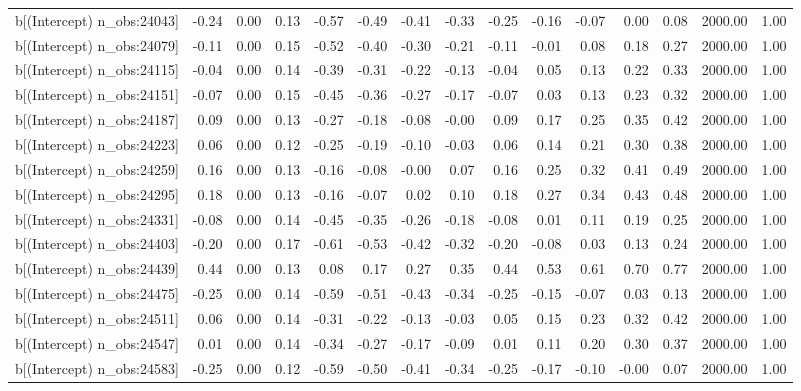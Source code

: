 \begin{table}[ht]
\begin{tabular}{rrrrrrrrrrrrrrr}
  b[(Intercept) n\_obs:24043] & -0.24 & 0.00 & 0.13 & -0.57 & -0.49 & -0.41 & -0.33 & -0.25 & -0.16 & -0.07 & 0.00 & 0.08 & 2000.00 & 1.00 \\ 
  b[(Intercept) n\_obs:24079] & -0.11 & 0.00 & 0.15 & -0.52 & -0.40 & -0.30 & -0.21 & -0.11 & -0.01 & 0.08 & 0.18 & 0.27 & 2000.00 & 1.00 \\ 
  b[(Intercept) n\_obs:24115] & -0.04 & 0.00 & 0.14 & -0.39 & -0.31 & -0.22 & -0.13 & -0.04 & 0.05 & 0.13 & 0.22 & 0.33 & 2000.00 & 1.00 \\ 
  b[(Intercept) n\_obs:24151] & -0.07 & 0.00 & 0.15 & -0.45 & -0.36 & -0.27 & -0.17 & -0.07 & 0.03 & 0.13 & 0.23 & 0.32 & 2000.00 & 1.00 \\ 
  b[(Intercept) n\_obs:24187] & 0.09 & 0.00 & 0.13 & -0.27 & -0.18 & -0.08 & -0.00 & 0.09 & 0.17 & 0.25 & 0.35 & 0.42 & 2000.00 & 1.00 \\ 
  b[(Intercept) n\_obs:24223] & 0.06 & 0.00 & 0.12 & -0.25 & -0.19 & -0.10 & -0.03 & 0.06 & 0.14 & 0.21 & 0.30 & 0.38 & 2000.00 & 1.00 \\ 
  b[(Intercept) n\_obs:24259] & 0.16 & 0.00 & 0.13 & -0.16 & -0.08 & -0.00 & 0.07 & 0.16 & 0.25 & 0.32 & 0.41 & 0.49 & 2000.00 & 1.00 \\ 
  b[(Intercept) n\_obs:24295] & 0.18 & 0.00 & 0.13 & -0.16 & -0.07 & 0.02 & 0.10 & 0.18 & 0.27 & 0.34 & 0.43 & 0.48 & 2000.00 & 1.00 \\ 
  b[(Intercept) n\_obs:24331] & -0.08 & 0.00 & 0.14 & -0.45 & -0.35 & -0.26 & -0.18 & -0.08 & 0.01 & 0.11 & 0.19 & 0.25 & 2000.00 & 1.00 \\ 
  b[(Intercept) n\_obs:24403] & -0.20 & 0.00 & 0.17 & -0.61 & -0.53 & -0.42 & -0.32 & -0.20 & -0.08 & 0.03 & 0.13 & 0.24 & 2000.00 & 1.00 \\ 
  b[(Intercept) n\_obs:24439] & 0.44 & 0.00 & 0.13 & 0.08 & 0.17 & 0.27 & 0.35 & 0.44 & 0.53 & 0.61 & 0.70 & 0.77 & 2000.00 & 1.00 \\ 
  b[(Intercept) n\_obs:24475] & -0.25 & 0.00 & 0.14 & -0.59 & -0.51 & -0.43 & -0.34 & -0.25 & -0.15 & -0.07 & 0.03 & 0.13 & 2000.00 & 1.00 \\ 
  b[(Intercept) n\_obs:24511] & 0.06 & 0.00 & 0.14 & -0.31 & -0.22 & -0.13 & -0.03 & 0.05 & 0.15 & 0.23 & 0.32 & 0.42 & 2000.00 & 1.00 \\ 
  b[(Intercept) n\_obs:24547] & 0.01 & 0.00 & 0.14 & -0.34 & -0.27 & -0.17 & -0.09 & 0.01 & 0.11 & 0.20 & 0.30 & 0.37 & 2000.00 & 1.00 \\ 
  b[(Intercept) n\_obs:24583] & -0.25 & 0.00 & 0.12 & -0.59 & -0.50 & -0.41 & -0.34 & -0.25 & -0.17 & -0.10 & -0.00 & 0.07 & 2000.00 & 1.00 \\ 

\end{tabular}
\end{table}
